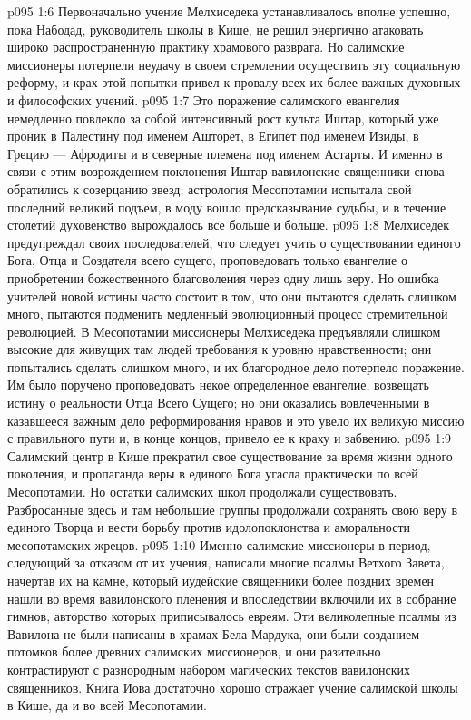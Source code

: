 \vs p095 1:6 \pc Первоначально учение Мелхиседека устанавливалось вполне успешно, пока Набодад, руководитель школы в Кише, не решил энергично атаковать широко распространенную практику храмового разврата. Но салимские миссионеры потерпели неудачу в своем стремлении осуществить эту социальную реформу, и крах этой попытки привел к провалу всех их более важных духовных и философских учений.
\vs p095 1:7 Это поражение салимского евангелия немедленно повлекло за собой интенсивный рост культа Иштар, который уже проник в Палестину под именем Ашторет, в Египет под именем Изиды, в Грецию --- Афродиты и в северные племена под именем Астарты. И именно в связи с этим возрождением поклонения Иштар вавилонские священники снова обратились к созерцанию звезд; астрология Месопотамии испытала свой последний великий подъем, в моду вошло предсказывание судьбы, и в течение столетий духовенство вырождалось все больше и больше.
\vs p095 1:8 Мелхиседек предупреждал своих последователей, что следует учить о существовании единого Бога, Отца и Создателя всего сущего, проповедовать только евангелие о приобретении божественного благоволения через одну лишь веру. Но ошибка учителей новой истины часто состоит в том, что они пытаются сделать слишком много, пытаются подменить медленный эволюционный процесс стремительной революцией. В Месопотамии миссионеры Мелхиседека предъявляли слишком высокие для живущих там людей требования к уровню нравственности; они попытались сделать слишком много, и их благородное дело потерпело поражение. Им было поручено проповедовать некое определенное евангелие, возвещать истину о реальности Отца Всего Сущего; но они оказались вовлеченными в казавшееся важным дело реформирования нравов и это увело их великую миссию с правильного пути и, в конце концов, привело ее к краху и забвению.
\vs p095 1:9 Салимский центр в Кише прекратил свое существование за время жизни одного поколения, и пропаганда веры в единого Бога угасла практически по всей Месопотамии. Но остатки салимских школ продолжали существовать. Разбросанные здесь и там небольшие группы продолжали сохранять свою веру в единого Творца и вести борьбу против идолопоклонства и аморальности месопотамских жрецов.
\vs p095 1:10 \pc Именно салимские миссионеры в период, следующий за отказом от их учения, написали многие псалмы Ветхого Завета, начертав их на камне, который иудейские священники более поздних времен нашли во время вавилонского пленения и впоследствии включили их в собрание гимнов, авторство которых приписывалось евреям. Эти великолепные псалмы из Вавилона не были написаны в храмах Бела\hyp{}Мардука, они были созданием потомков более древних салимских миссионеров, и они разительно контрастируют с разнородным набором магических текстов вавилонских священников. Книга Иова достаточно хорошо отражает учение салимской школы в Кише, да и во всей Месопотамии.
